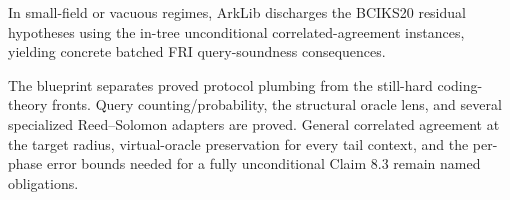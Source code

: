 \begin{theorem}\label{thm:batched_fri_small_field}
    In small-field or vacuous regimes, ArkLib discharges the BCIKS20 residual hypotheses using
    the in-tree unconditional correlated-agreement instances, yielding concrete batched FRI
    query-soundness consequences.
\end{theorem}

\begin{remark}\label{rem:batched_fri_status}
    The blueprint separates proved protocol plumbing from the still-hard coding-theory fronts.
    Query counting/probability, the structural oracle lens, and several specialized
    Reed--Solomon adapters are proved.  General correlated agreement at the target radius,
    virtual-oracle preservation for every tail context, and the per-phase error bounds needed for
    a fully unconditional Claim 8.3 remain named obligations.
\end{remark}
